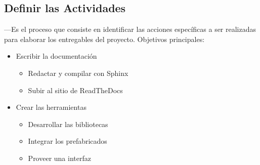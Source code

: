 \documentclass[]{article}
\begin{document}
\subsection{ Definir las Actividades}
—Es el proceso que consiste en identificar las acciones
espec\'ificas a ser realizadas para elaborar los entregables del proyecto.
Objetivos principales:
\begin{itemize}
\item	Escribir la documentaci\'on
\begin{itemize}
	\item	Redactar y compilar con Sphinx
	\item 	Subir al sitio de ReadTheDocs
\end{itemize}
\item	Crear las herramientas
\begin{itemize}
\item	Desarrollar las bibliotecas
\item	Integrar los prefabricados
\item	Proveer una interfaz
\end{itemize}
\end{itemize}
\end{document}
